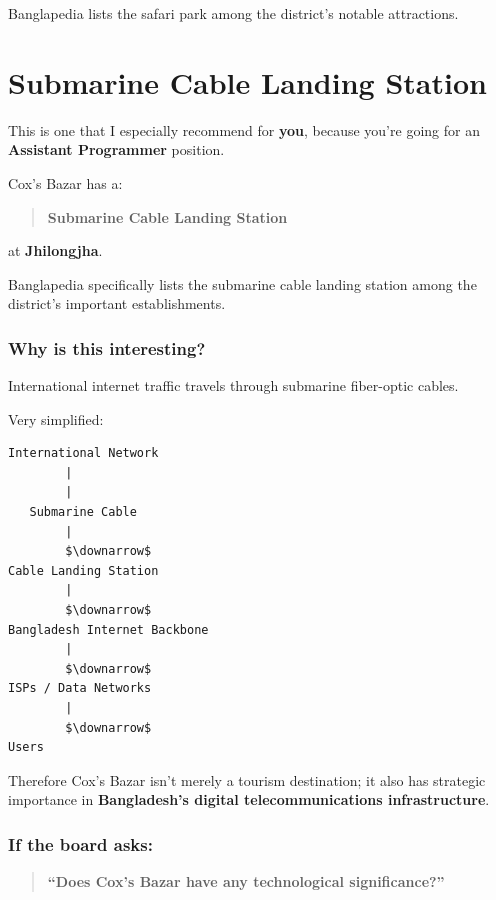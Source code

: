 Banglapedia lists the safari park among the district's notable attractions.

\medskip

\section{Submarine Cable Landing Station}

This is one that I especially recommend for \textbf{you}, because you're going for an \textbf{Assistant Programmer} position.

Cox's Bazar has a:

\begin{quote}
\textbf{Submarine Cable Landing Station}\\
\end{quote}

at \textbf{Jhilongjha}.

Banglapedia specifically lists the submarine cable landing station among the district's important establishments.

\subsubsection{Why is this interesting?}

International internet traffic travels through submarine fiber-optic cables.

Very simplified:

\begin{lstlisting}
International Network
        |
        |
   Submarine Cable
        |
        $\downarrow$
Cable Landing Station
        |
        $\downarrow$
Bangladesh Internet Backbone
        |
        $\downarrow$
ISPs / Data Networks
        |
        $\downarrow$
Users
\end{lstlisting}

Therefore Cox's Bazar isn't merely a tourism destination; it also has strategic importance in \textbf{Bangladesh's digital telecommunications infrastructure}.

\subsubsection{If the board asks:}

\begin{quote}
\textbf{``Does Cox's Bazar have any technological significance?''}\\
\end{quote}

